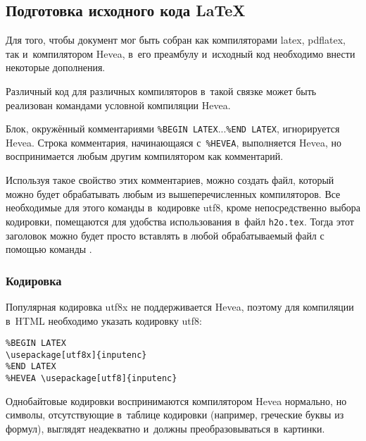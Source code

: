 \documentclass[10pt, a5paper]{article}
\begin{document}
\subsection*{Подготовка исходного кода \LaTeX}

Для того, чтобы документ мог быть собран как компиляторами latex, pdflatex, так и~компилятором Hevea, в~его преамбулу и~исходный код необходимо внести некоторые дополнения.

Различный код для различных компиляторов в~такой связке может быть реализован командами условной компиляции Hevea.

Блок, окружённый комментариями \verb!%BEGIN LATEX!...\verb!%END LATEX!, игнорируется Hevea.
Строка комментария, начинающаяся с~\verb!%HEVEA!, выполняется Hevea, но воспринимается любым другим компилятором как комментарий.

Используя такое свойство этих комментариев, можно создать
файл, который можно будет обрабатывать любым из вышеперечисленных компиляторов.
Все необходимые для этого команды в~кодировке utf8, кроме непосредственно выбора кодировки, помещаются для удобства использования в~файл \verb!h2o.tex!. Тогда этот заголовок можно будет просто вставлять в любой обрабатываемый файл с помощью команды \verb!!.

\subsubsection*{Кодировка}

Популярная кодировка utf8x не поддерживается Hevea, поэтому для компиляции в~HTML необходимо указать кодировку utf8:
\begin{verbatim}
%BEGIN LATEX
\usepackage[utf8x]{inputenc}
%END LATEX
%HEVEA \usepackage[utf8]{inputenc}
\end{verbatim}

Однобайтовые кодировки воспринимаются компилятором Hevea нормально, но символы, отсутствующие в~таблице кодировки (например, греческие буквы из формул), выглядят неадекватно и~должны преобразовываться в~картинки.

% 
% 
\end{document}
